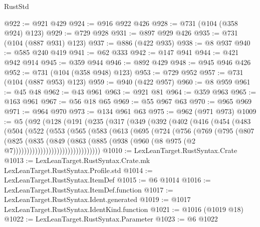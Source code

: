 \begin{lexlean}{RustStd}
\begin{coremodule}
@922 := @921 @429
@924 := @916 @922 @426
@928 := @731 (@104 (@358 @924) @123)
@929 := @729 @928
@931 := @897 @929 @426
@935 := @731 (@104 (@887 @931) @123)
@937 := @886 (@422 @935)
@938 := @8 @937
@940 := @585 @240 @419
@941 := @62 @333
@942 := @147 @941
@944 := @421 @942 @914
@945 := @359 @944
@946 := @892 @429
@948 := @945 @946 @426
@952 := @731 (@104 (@358 @948) @123)
@953 := @729 @952
@957 := @731 (@104 (@887 @953) @123)
@959 := @940 (@422 @957)
@960 := @8 @959
@961 := @45 @48
@962 := @43 @961
@963 := @921 @81
@964 := @359 @963
@965 := @163 @961
@967 := @56 @18 @65
@969 := @55 @967 @63
@970 := @965 @969
@971 := @964 @970
@973 := @134 @961 @63
@975 := @962 (@971 @973)
@1009 := @5
    (@92
      (@128
        (@191
          (@235
            (@317
              (@349
                (@392
                  (@402
                    (@416
                      (@454
                        (@483
                          (@504
                            (@522
                              (@553
                                (@565
                                  (@583
                                    (@613
                                      (@695
                                        (@724
                                          (@756
                                            (@769
                                              (@795
                                                (@807
                                                  (@825
                                                    (@835
                                                      (@849
                                                        (@863
                                                          (@885
                                                            (@938
                                                              (@960
                                                                (@8
                                                                  @975
                                                                  (@2
                                                                    @7))))))))))))))))))))))))))))))))
@1010 := LexLeanTarget.RustSyntax.Crate
@1013 := LexLeanTarget.RustSyntax.Crate.mk LexLeanTarget.RustSyntax.Profile.std
@1014 := LexLeanTarget.RustSyntax.ItemDef
@1015 := @6 @1014
@1016 := LexLeanTarget.RustSyntax.ItemDef.function
@1017 := LexLeanTarget.RustSyntax.Ident.generated
@1019 := @1017 LexLeanTarget.RustSyntax.IdentKind.function
@1021 := @1016 (@1019 @18)
@1022 := LexLeanTarget.RustSyntax.Parameter
@1023 := @6 @1022

\end{coremodule}
\end{lexlean}
